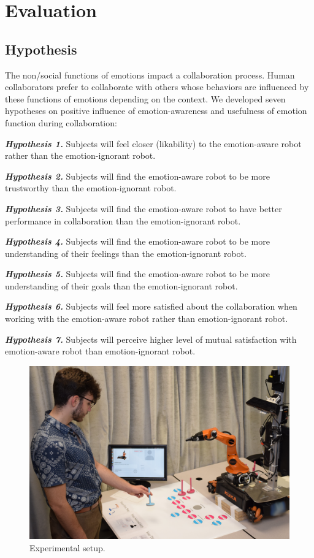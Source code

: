 \documentclass[12pt]{report}
\begin{document}
\section{Evaluation}
\subsection{Hypothesis}

The non/social functions of emotions impact a collaboration process. Human
collaborators prefer to collaborate with others whose behaviors are influenced
by these functions of emotions depending on the context. We developed seven
hypotheses on positive influence of emotion-awareness and usefulness of emotion
function during collaboration:

\textit{\textbf{Hypothesis 1.}} Subjects will feel closer (likability) to the
emotion-aware robot rather than the emotion-ignorant robot.

\textit{\textbf{Hypothesis 2.}} Subjects will find the emotion-aware robot to be
more trustworthy than the emotion-ignorant robot.

\textit{\textbf{Hypothesis 3.}} Subjects will find the emotion-aware robot to
have better performance in collaboration than the emotion-ignorant robot.

\textit{\textbf{Hypothesis 4.}} Subjects will find the emotion-aware robot to be
more understanding of their feelings than the emotion-ignorant robot.

\textit{\textbf{Hypothesis 5.}} Subjects will find the emotion-aware robot to be
more understanding of their goals than the emotion-ignorant robot.

\textit{\textbf{Hypothesis 6.}} Subjects will feel more satisfied about the
collaboration when working with the emotion-aware robot rather than
emotion-ignorant robot.

\textit{\textbf{Hypothesis 7.}} Subjects will perceive higher level of mutual
satisfaction with emotion-aware robot than emotion-ignorant robot.

\begin{figure}
  \centering
  \includegraphics[width=1\textwidth]{figure/environment.png}
  \caption{{\fontsize{9}{9}\selectfont Experimental setup.}}
  \label{fig:environment}
  \vspace*{-5mm}
\end{figure}
\end{document}
